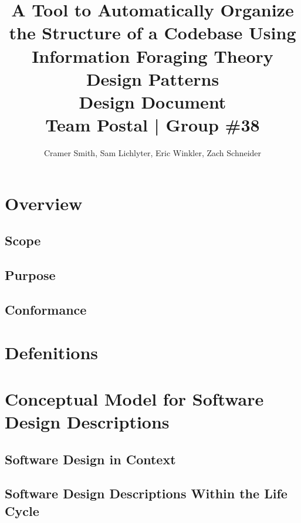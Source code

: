 \documentclass[letterpaper,10pt,titlepage,draftclsnofoot,onecolumn,onesided] {IEEEtran}
\def\doctitle{A Tool to Automatically Organize the Structure of a Codebase Using Information Foraging Theory Design Patterns}
\def\doctype{Design Document}
\def\team{Team Postal | Group \#38}
\begin{document}
\title{\Huge{\bfseries{\textsf{\doctitle}}}\\\textsf{\Large{\doctype}}\\\textsf{\large{\team}}}
\author{Cramer Smith, Sam Lichlyter, Eric Winkler, Zach Schneider}

\maketitle
\vfill
\vfill

\pagebreak

\tableofcontents

\pagebreak

\section{Overview}

\subsection{Scope}

\subsection{Purpose}

\subsection{Conformance}

\section{Defenitions}

\section{Conceptual Model for Software Design Descriptions}
\subsection{Software Design in Context}

\subsection{Software Design Descriptions Within the Life Cycle}
\end{document}

